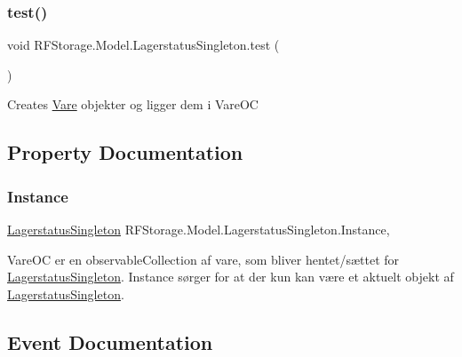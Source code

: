 \subsubsection{\texorpdfstring{test()}{test()}}
{\footnotesize\ttfamily void R\+F\+Storage.\+Model.\+Lagerstatus\+Singleton.\+test (\begin{DoxyParamCaption}{ }\end{DoxyParamCaption})}



Creates \mbox{\hyperlink{class_r_f_storage_1_1_model_1_1_vare}{Vare}} objekter og ligger dem i Vare\+OC 



\subsection{Property Documentation}
\mbox{\label{class_r_f_storage_1_1_model_1_1_lagerstatus_singleton_acc6cbbcfb1f6e4d33090692f1089dadc}} 
\subsubsection{\texorpdfstring{Instance}{Instance}}
{\footnotesize\ttfamily \mbox{\hyperlink{class_r_f_storage_1_1_model_1_1_lagerstatus_singleton}{Lagerstatus\+Singleton}} R\+F\+Storage.\+Model.\+Lagerstatus\+Singleton.\+Instance\hspace{0.3cm}{\ttfamily [static]}, {\ttfamily [get]}}



Vare\+OC er en observable\+Collection af vare, som bliver hentet/sættet for \mbox{\hyperlink{class_r_f_storage_1_1_model_1_1_lagerstatus_singleton}{Lagerstatus\+Singleton}}. Instance sørger for at der kun kan være et aktuelt objekt af \mbox{\hyperlink{class_r_f_storage_1_1_model_1_1_lagerstatus_singleton}{Lagerstatus\+Singleton}}. 



\subsection{Event Documentation}
\mbox{\label{class_r_f_storage_1_1_model_1_1_lagerstatus_singleton_a9dec22a87bd75429a7f96a7528c07f85}} 
